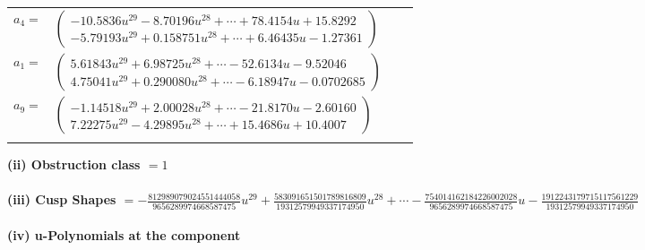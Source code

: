 \documentclass[1p]{elsarticle_modified}
\theoremstyle{definition}
\begin{document}
\begin{tabular}{m{7pt} m{180pt} m{7pt} m{180pt} }
\flushright $a_{4}=$&$\begin{pmatrix}-10.5836 u^{29}-8.70196 u^{28}+\cdots+78.4154 u+15.8292\\-5.79193 u^{29}+0.158751 u^{28}+\cdots+6.46435 u-1.27361\end{pmatrix}$ \\
\flushright $a_{1}=$&$\begin{pmatrix}5.61843 u^{29}+6.98725 u^{28}+\cdots-52.6134 u-9.52046\\4.75041 u^{29}+0.290080 u^{28}+\cdots-6.18947 u-0.0702685\end{pmatrix}$ \\
\flushright $a_{9}=$&$\begin{pmatrix}-1.14518 u^{29}+2.00028 u^{28}+\cdots-21.8170 u-2.60160\\7.22275 u^{29}-4.29895 u^{28}+\cdots+15.4686 u+10.4007\end{pmatrix}$\\&\end{tabular}
\flushleft \textbf{(ii) Obstruction class $= 1$}\\~\\
\flushleft \textbf{(iii) Cusp Shapes $= -\frac{812989079024551444058}{9656289974668587475} u^{29}+\frac{583091651501789816809}{19312579949337174950} u^{28}+\cdots-\frac{754014162184226002028}{9656289974668587475} u-\frac{1912243179715117561229}{19312579949337174950}$}\\~\\
\newpage\renewcommand{\arraystretch}{1}
\flushleft \textbf{(iv) u-Polynomials at the component}\newline \\
\end{document}
